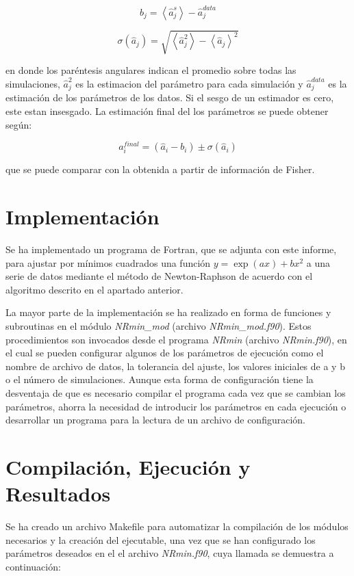 \documentclass{article}
\begin{document}
\[b_j = \left< \hat{a}_j^s \right> - \hat{a}_j^{data} \]

\[\sigma({\hat{a}_j}) = \sqrt{\left< \hat{a}_j^2 \right> - \left< \hat{a}_j \right>^2 }\]

en donde los paréntesis angulares indican el promedio sobre todas las
simulaciones, \(\hat{a}_j^2\) es la estimacion del parámetro para cada
simulación y \(\hat{a}_j^{data}\) es la estimación de los parámetros de
los datos. Si el sesgo de un estimador es cero, este estan insesgado. La
estimación final del los parámetros se puede obtener según:

\[a^{final}_i = (\hat{a}_i - b_i) \pm \sigma(\hat{a}_i)\]

que se puede comparar con la obtenida a partir de información de Fisher.


    \section{Implementación}


    Se ha implementado un programa de Fortran, que se adjunta con este
informe, para ajustar por mínimos cuadrados una función
\(y=\exp(ax)+bx^2\) a una serie de datos mediante el método de
Newton-Raphson de acuerdo con el algoritmo descrito en el apartado
anterior.

La mayor parte de la implementación se ha realizado en forma de
funciones y subroutinas en el módulo \emph{NRmin\_mod} (archivo
\emph{NRmin\_mod.f90}). Estos procedimientos son invocados desde el
programa \emph{NRmin} (archivo \emph{NRmin.f90}), en el cual se pueden
configurar algunos de los parámetros de ejecución como el nombre de
archivo de datos, la tolerancia del ajuste, los valores iniciales de a y
b o el número de simulaciones. Aunque esta forma de configuración tiene
la desventaja de que es necesario compilar el programa cada vez que se
cambian los parámetros, ahorra la necesidad de introducir los parámetros
en cada ejecución o desarrollar un programa para la lectura de un
archivo de configuración.


    \section{Compilación, Ejecución y Resultados}


    Se ha creado un archivo Makefile para automatizar la compilación de los
módulos necesarios y la creación del ejecutable, una vez que se han
configurado los parámetros deseados en el el archivo \emph{NRmin.f90},
cuya llamada se demuestra a continuación:
\end{document}
